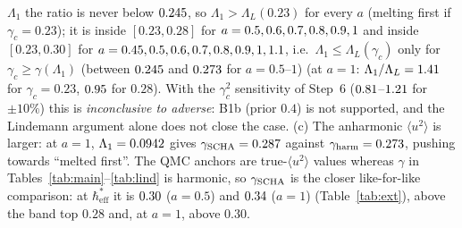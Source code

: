 \documentclass[10pt]{article}
\newcommand{\hb}{\hbar_{\mathrm{eff}}}
\begin{document}
$\Lambda_1$ the ratio is never below $0.245$, so $\Lambda_1>\Lambda_L(0.23)$ for every $a$ (melting first if $\gamma_c=0.23$); it is inside $[0.23,0.28]$ for $a=0.5, 0.6, 0.7, 0.8, 0.9, 1$ and inside $[0.23,0.30]$ for $a=0.45, 0.5, 0.6, 0.7, 0.8, 0.9, 1, 1.1$, i.e.\ $\Lambda_1\le\Lambda_L(\gamma_c)$ only for $\gamma_c\ge\gamma(\Lambda_1)$ (between $0.245$ and $0.273$ for $a=0.5$--$1$)
(at $a=1$: $\Lambda_1/\Lambda_L=1.41$ for $\gamma_c=0.23$, $0.95$ for $0.28$). With the $\gamma_c^2$ sensitivity of Step~6 ($0.81$--$1.21$ for $\pm10\%$) this is \emph{inconclusive to adverse}: B1b (prior $0.4$) is not supported, and the Lindemann argument alone does not close the case. (c) The anharmonic
$\langle u^2\rangle$ is larger: at $a=1$, $\Lambda_1=0.0942$ gives $\gamma_{\rm SCHA}=0.287$ against $\gamma_{\rm harm}=0.273$, pushing towards ``melted first''. The QMC anchors are true-$\langle u^2\rangle$ values whereas $\gamma$ in Tables~\ref{tab:main}--\ref{tab:lind} is harmonic, so $\gamma_{\rm SCHA}$ is the closer like-for-like comparison: at $\hb^*$ it is $0.30$ ($a=0.5$) and $0.34$ ($a=1$) (Table~\ref{tab:ext}), above the band top $0.28$ and, at $a=1$, above $0.30$.
\end{document}
